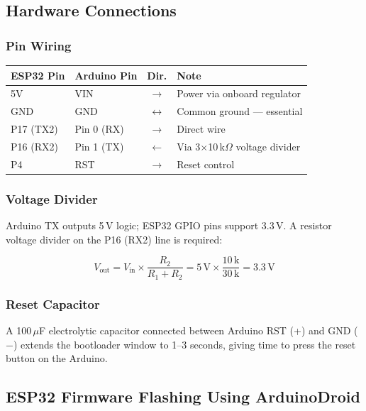 \documentclass[11pt, a4paper]{article}
\begin{document}
\subsection{Hardware Connections}

\subsubsection{Pin Wiring}

\begin{center}
\begin{tabular}{@{} l l c l @{}}
\toprule
\textbf{ESP32 Pin} & \textbf{Arduino Pin} & \textbf{Dir.} & \textbf{Note} \\
\midrule
5V         & VIN        & $\rightarrow$     & Power via onboard regulator \\
GND        & GND        & $\leftrightarrow$ & Common ground --- essential \\
P17 (TX2)  & Pin 0 (RX) & $\rightarrow$     & Direct wire \\
P16 (RX2)  & Pin 1 (TX) & $\leftarrow$      & Via 3$\times$10\,k$\Omega$ voltage divider \\
P4         & RST        & $\rightarrow$     & Reset control \\
\bottomrule
\end{tabular}
\end{center}

\subsubsection{Voltage Divider}

Arduino TX outputs 5\,V logic; ESP32 GPIO pins support 3.3\,V.
A resistor voltage divider on the P16 (RX2) line is required:

\[
  V_{\text{out}} = V_{\text{in}} \times \frac{R_2}{R_1 + R_2}
  = 5\,\text{V} \times \frac{10\,\text{k}}{30\,\text{k}} = 3.3\,\text{V}
\]

\subsubsection{Reset Capacitor}
\label{sec:cap}

A 100\,$\mu$F electrolytic capacitor connected between Arduino RST (+) and
GND ($-$) extends the bootloader window to 1--3 seconds, giving time to press
the reset button on the Arduino.

\subsection{ESP32 Firmware Flashing Using ArduinoDroid}
\end{document}
